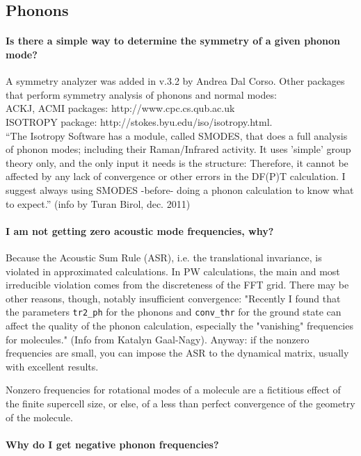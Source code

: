 \documentclass[12pt,a4paper]{article}
\begin{document}
\subsection{ Phonons }

\paragraph{ Is there a simple way to determine the symmetry of a given 
phonon mode?} 

A symmetry analyzer was added in v.3.2 by Andrea Dal Corso. 
Other packages that perform symmetry analysis of phonons and normal modes:\\
ACKJ, ACMI packages: http://www.cpc.cs.qub.ac.uk\\
ISOTROPY package: http://stokes.byu.edu/iso/isotropy.html.\\
``The Isotropy Software has a module, called SMODES, that does a full
analysis of phonon modes; including their Raman/Infrared activity. It
uses 'simple' group theory only, and the only input it needs is the
structure: Therefore, it cannot be affected by any lack of convergence
or other errors in the DF(P)T calculation. I suggest always using
SMODES -before- doing a phonon calculation to know what to expect.''
(info by Turan Birol, dec. 2011)

\paragraph{I am not getting zero acoustic mode frequencies, why? }

Because the Acoustic Sum Rule (ASR), i.e. the translational invariance,
is violated in approximated calculations. In PW calculations, 
the main and most irreducible violation comes from the discreteness
of the FFT grid. There may be other reasons, though, notably
insufficient convergence: "Recently I found that the parameters
\texttt{tr2\_ph} for the phonons and \texttt{conv\_thr} for the 
ground state can affect the quality of the phonon calculation,
 especially the "vanishing" frequencies for molecules."
(Info from Katalyn Gaal-Nagy). Anyway: if the nonzero frequencies are
small, you can impose the ASR to the dynamical matrix, usually with
excellent results.

Nonzero frequencies for rotational modes of a molecule are a fictitious 
effect of the finite supercell size, or else, of a less than perfect
convergence of the geometry of the molecule.

\paragraph{Why do I get negative phonon frequencies? }
\end{document}
